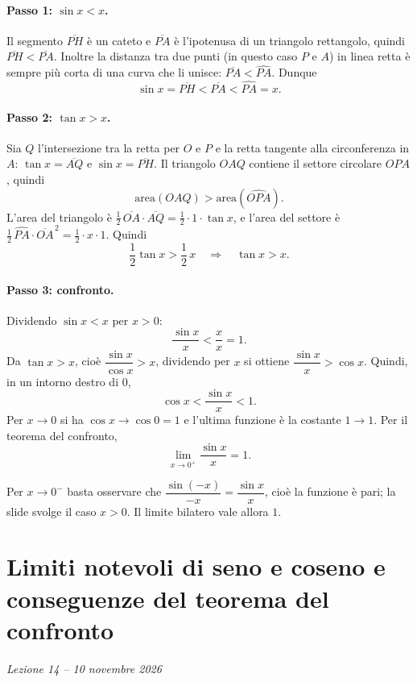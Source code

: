 \documentclass[11pt,a4paper]{article}
\begin{document}
\paragraph{Passo 1: $\sin x < x$.} Il segmento $\overline{PH}$ è un cateto e $\overline{PA}$ è l'ipotenusa di un triangolo rettangolo, quindi $\overline{PH} < \overline{PA}$. Inoltre la distanza tra due punti (in questo caso $P$ e $A$) in linea retta è sempre più corta di una curva che li unisce: $\overline{PA} < \widehat{PA}$. Dunque
\[
  \sin x = \overline{PH} < \overline{PA} < \widehat{PA} = x .
\]

\paragraph{Passo 2: $\tan x > x$.} Sia $Q$ l'intersezione tra la retta per $O$ e $P$ e la retta tangente alla circonferenza in $A$: $\tan x = \overline{AQ}$ e $\sin x = \overline{PH}$. Il triangolo $OAQ$ contiene il settore circolare $OPA$, quindi
\[
  \text{area}(OAQ) > \text{area}(\widehat{OPA}) .
\]
L'area del triangolo è $\frac{1}{2}\,\overline{OA}\cdot\overline{AQ} = \frac{1}{2}\cdot 1\cdot\tan x$, e l'area del settore è $\frac{1}{2}\,\widehat{PA}\cdot\overline{OA}^{\,2} = \frac{1}{2}\cdot x\cdot 1$. Quindi
\[
  \frac{1}{2}\tan x > \frac{1}{2}\,x \quad\Longrightarrow\quad \tan x > x .
\]

\paragraph{Passo 3: confronto.} Dividendo $\sin x < x$ per $x > 0$:
\[
  \frac{\sin x}{x} < \frac{x}{x} = 1 .
\]
Da $\tan x > x$, cioè $\dfrac{\sin x}{\cos x} > x$, dividendo per $x$ si ottiene $\dfrac{\sin x}{x} > \cos x$. Quindi, in un intorno destro di $0$,
\[
  \cos x < \frac{\sin x}{x} < 1 .
\]
Per $x \to 0$ si ha $\cos x \to \cos 0 = 1$ e l'ultima funzione è la costante $1 \to 1$. Per il teorema del confronto,
\[
  \lim_{x\to 0^+}\frac{\sin x}{x} = 1 .
\]

\begin{osservazione}
Per $x \to 0^-$ basta osservare che $\dfrac{\sin(-x)}{-x} = \dfrac{\sin x}{x}$, cioè la funzione è pari; la slide svolge il caso $x > 0$. Il limite bilatero vale allora $1$.
\end{osservazione}

\section[Limiti notevoli di seno e coseno e conseguenze del teorema del confronto (Lezione 14 -- 10 novembre 2026)]{Limiti notevoli di seno e coseno e conseguenze del teorema del confronto}
\noindent\emph{Lezione 14 -- 10 novembre 2026}
\end{document}
